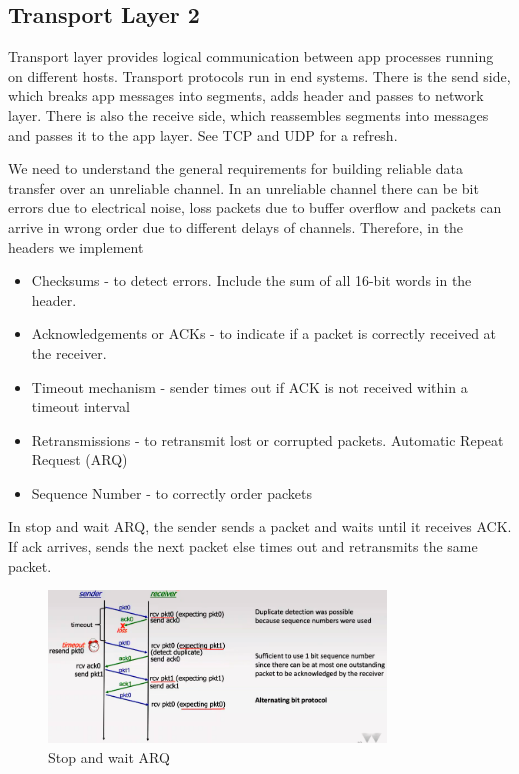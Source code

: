\documentclass[a4paper]{article}
\theoremstyle{plain}
\theoremstyle{definition}
\newtheorem{defn}{Definition}[section]
\theoremstyle{remark}
\begin{document}
\subsection{Transport Layer 2}
Transport layer provides logical communication between app processes running on different hosts. Transport protocols run in end systems. There is the send side, which breaks app messages into segments, adds header and passes to network layer. There is also the receive side, which reassembles segments into messages and passes it to the app layer. See TCP and UDP for a refresh.

\begin{tcolorbox}[colback=black!3!white,colframe=black!60!white,title=\begin{defn}Reliable transfer over a unreliable channel \label{Reliable transfer over a unreliable channel}\end{defn}]
We need to understand the general requirements for building reliable data transfer over an unreliable channel. In an unreliable channel there can be bit errors due to electrical noise, loss packets due to buffer overflow and packets can arrive in wrong order due to different delays of channels. Therefore, in the headers we implement
\begin{itemize}
	\item Checksums - to detect errors. Include the sum of all 16-bit words in the header.
	\item Acknowledgements or ACKs - to indicate if a packet is correctly received at the receiver. 
	\item Timeout mechanism - sender times out if ACK is not received within a timeout interval
	\item Retransmissions - to retransmit lost or corrupted packets. Automatic Repeat Request (ARQ)
	\item Sequence Number - to correctly order packets 
\end{itemize}
\end{tcolorbox}
\begin{tcolorbox}[colback=black!3!white,colframe=black!60!white,title=\begin{defn}Stop and Wait ARQ \label{Stop and Wait ARQ}\end{defn}]
In stop and wait ARQ, the sender sends a packet and waits until it receives ACK. If ack arrives, sends the next packet else times out and retransmits the same packet.
\begin{figure}[H]
	\centering
	\includegraphics[width=0.8\textwidth]{fiftyfive.png}
	\caption{Stop and wait ARQ}
	\label{fig:fiftyfive-png}
\end{figure}
\end{tcolorbox}
\end{document}
